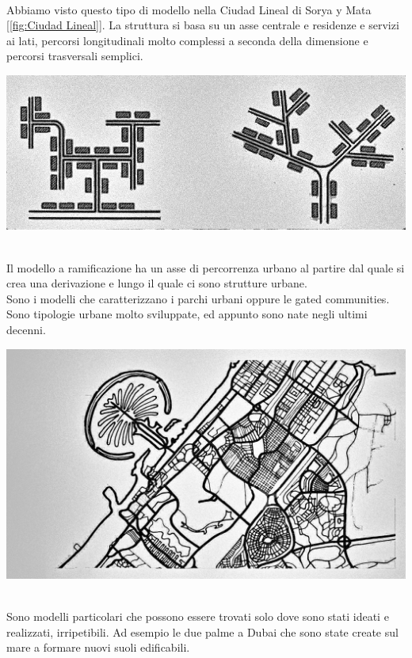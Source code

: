 \documentclass[a4paper,12pt, oneside]{book}
\begin{document}
  \leavevmode\\
  Abbiamo visto questo tipo di modello nella Ciudad Lineal di Sorya y Mata [\ref{fig:Ciudad Lineal}]. La struttura si basa su un asse centrale e residenze e servizi ai lati, percorsi longitudinali molto complessi a seconda della dimensione e percorsi trasversali semplici.\\
  \begin{center}
  	\includegraphics[width=0.6\linewidth]{"immagini/modello a ramificazione"}
  	\label{fig:modello a ramificazione}
  \end{center}
  \leavevmode\\
  Il modello a ramificazione ha un asse di percorrenza urbano al partire dal quale si crea una derivazione e lungo il quale ci sono strutture urbane.\\ Sono i modelli che caratterizzano i parchi urbani oppure le gated communities.\\ Sono tipologie urbane molto sviluppate, ed appunto sono nate negli ultimi decenni.\\
  \begin{center}
  	\includegraphics[width=0.6\linewidth]{"immagini/dubai mappa"}
  	\label{fig:dubai mappa}
  \end{center}
  \leavevmode\\
  Sono modelli particolari che possono essere trovati solo dove sono stati ideati e realizzati, irripetibili. Ad esempio le due palme a Dubai che sono state create sul mare a formare nuovi suoli edificabili.\\
\end{document}
